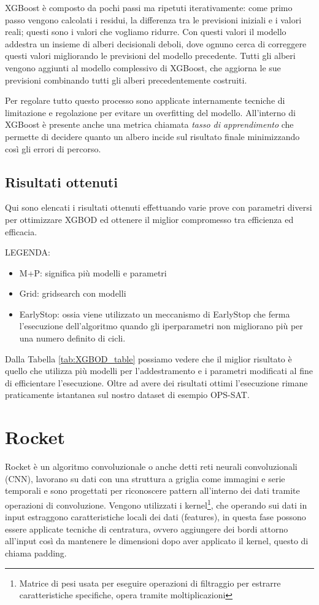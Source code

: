 XGBoost è composto da pochi passi ma ripetuti iterativamente: come primo passo vengono calcolati i residui, la differenza tra le previsioni iniziali e i valori reali; questi sono i valori che vogliamo ridurre. Con questi valori il modello addestra un insieme di alberi decisionali deboli, dove ognuno cerca di correggere questi valori migliorando le previsioni del modello precedente. Tutti gli alberi vengono aggiunti al modello complessivo di XGBoost, che aggiorna le sue previsioni combinando tutti gli alberi precedentemente costruiti.

Per regolare tutto questo processo sono applicate internamente tecniche di limitazione e regolazione per evitare un overfitting del modello. All'interno di XGBoost è presente anche una metrica chiamata \textit{tasso di apprendimento} che permette di decidere quanto un albero incide sul risultato finale minimizzando così gli errori di percorso.

\subsection{Risultati ottenuti}
Qui sono elencati i risultati ottenuti effettuando varie prove con parametri diversi per ottimizzare XGBOD ed ottenere il miglior compromesso tra efficienza ed efficacia.
\pagebreak


LEGENDA:
\begin{itemize}
    \item M+P: significa più modelli e parametri
    \item Grid: gridsearch con modelli
    \item EarlyStop: ossia viene utilizzato un meccanismo di EarlyStop che ferma l'esecuzione dell'algoritmo quando gli iperparametri non migliorano più per una numero definito di cicli.
\end{itemize}

Dalla Tabella \ref{tab:XGBOD_table} possiamo vedere che il miglior risultato è quello che utilizza più modelli per l'addestramento e i parametri modificati al fine di efficientare l'esecuzione. Oltre ad avere dei risultati ottimi l'esecuzione rimane praticamente istantanea sul nostro dataset di esempio OPS-SAT.

\section{Rocket}
Rocket è un algoritmo convoluzionale o anche detti reti neurali convoluzionali (CNN), lavorano su dati con una struttura a griglia come immagini e serie temporali e sono progettati per riconoscere pattern all'interno dei dati tramite operazioni di convoluzione.
Vengono utilizzati i kernel\footnote{Matrice di pesi usata per eseguire operazioni di filtraggio per estrarre caratteristiche specifiche, opera tramite moltiplicazioni}, che operando sui dati in input estraggono caratteristiche locali dei dati (features), in questa fase possono essere applicate tecniche di centratura, ovvero aggiungere dei bordi attorno all'input così da mantenere le dimensioni dopo aver applicato il kernel, questo di chiama padding.

